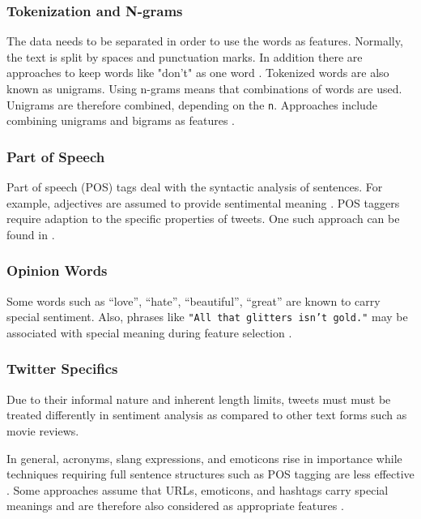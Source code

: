 \documentclass{acm_proc_article-sp}
\begin{document}
\subsubsection{Tokenization and N-grams}

The data needs to be separated in
order to use the words as features. Normally, the text is split by spaces and
punctuation marks. In addition there are approaches to keep words like "don't"
as one word \cite{pak2010twitter}. Tokenized words are also known as unigrams.
Using n-grams means that combinations of words are used. Unigrams are therefore
combined, depending on the \texttt{n}. Approaches include combining
unigrams and bigrams as features \cite{liu2010sentimentanalysis,
go2009twitter}.

\subsubsection{Part of Speech}

Part of speech (POS) tags deal with the
syntactic analysis of sentences. For example, adjectives are assumed to provide
sentimental meaning \cite{liu2010sentimentanalysis}.
POS taggers require adaption to the specific properties of tweets.
One such approach can be found in \cite{gimpel2011part}. 

\subsubsection{Opinion Words}

Some words such as ``love'', ``hate'', ``beautiful'', ``great'' are 
known to carry special sentiment.
Also, phrases like \texttt{"All that glitters
isn't gold."} may be associated with special meaning during feature selection
\cite{liu2010sentimentanalysis}.

\subsubsection{Twitter Specifics}

Due to their informal nature and inherent length limits, tweets must must be treated
differently in sentiment analysis as compared to other text forms such as movie reviews.

In general, acronyms, slang expressions, and emoticons rise in importance while
techniques requiring full sentence structures such as POS tagging are less effective \cite{kouloumpis2011twitter}.
Some approaches assume that URLs, emoticons, and hashtags carry special meanings and are
therefore also considered as appropriate features \cite{gimpel2011part}.
\end{document}
